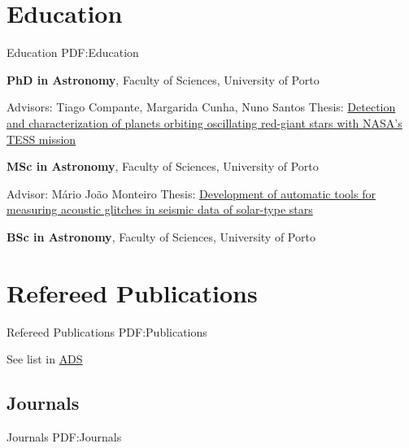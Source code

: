\documentclass[letterpaper,10pt,oneside]{article}
\begin{document}
\begin{body}


\section
{Education}
{Education}
{PDF:Education}

\textbf{PhD in Astronomy}, Faculty of Sciences, University of Porto
\hfill
\begin{detail}
\BulletItem
Advisors: Tiago Compante, Margarida Cunha, Nuno Santos
\BulletItem
Thesis: \href{https://hdl.handle.net/10216/138552}{Detection and characterization of planets orbiting oscillating red-giant stars with NASA's TESS mission}
\end{detail}

\GapNoBreak
\textbf{MSc in Astronomy}, Faculty of Sciences, University of Porto
\hfill
\begin{detail}
\BulletItem
Advisor: Mário João Monteiro
\BulletItem
Thesis: \href{https://repositorio-aberto.up.pt/handle/10216/90991}{Development of automatic tools for measuring acoustic glitches in seismic data of solar-type stars}
\end{detail}


\GapNoBreak
\textbf{BSc in Astronomy}, Faculty of Sciences, University of Porto
\hfill



\section
{Refereed Publications}
{Refereed Publications}
{PDF:Publications}

See list in \href{https://ui.adsabs.harvard.edu/public-libraries/gKWEYjBTR7KtFkRn00r-pw}{ADS} 

\GapNoBreak
\subsection
{Journals}
{Journals}
{PDF:Journals}


\end{body}
\end{document}
